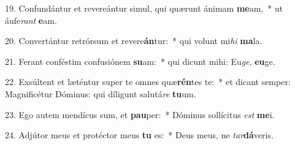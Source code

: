 19. Confundántur et revereántur simul, qui quærunt ánimam \textbf{me}am,~*  ut áufe\textit{rant} \textbf{e}am.\

20. Convertántur retrórsum et revere\textbf{án}tur:~*  qui volunt mi\textit{hi} \textbf{ma}la.\

21. Ferant conféstim confusiónem \textbf{su}am:~*  qui dicunt mihi: Eu\textit{ge}, \textbf{eu}ge.\

22. Exsúltent et læténtur super te omnes quæ\textbf{rén}tes te:~*  et dicant semper: Magnificétur Dóminus: qui díligunt salutá\textit{re} \textbf{tu}um.\

23. Ego autem mendícus sum, et \textbf{pau}per:~*  Dóminus sollícitus \textit{est} \textbf{me}i.\

24. Adjútor meus et protéctor meus \textbf{tu} es:~*  Deus meus, ne \textit{tar}\textbf{dá}veris.\

